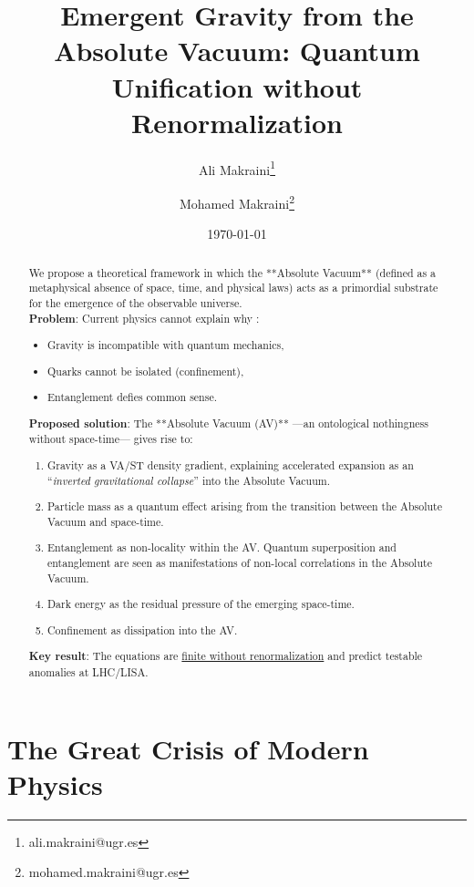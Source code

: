 \documentclass[a4paper]{article}
\title{Emergent Gravity from the Absolute Vacuum: Quantum Unification without Renormalization}
\author[1]{Ali Makraini\thanks{ali.makraini@ugr.es}}
\author[1]{Mohamed Makraini\thanks{mohamed.makraini@ugr.es}}
\affil[1]{\normalsize Department of Physics, University of Granada}
\date{\today}
\theoremstyle{definition}
\theoremstyle{remark}
\numberwithin{equation}{section}
\begin{document}
	
	\maketitle
\begin{abstract}
	\noindent
	We propose a theoretical framework in which the **Absolute Vacuum** (defined as a metaphysical absence of space, time, and physical laws) acts as a primordial substrate \cite{Carlip2012} for the emergence of the observable universe.\\
	
	\textbf{Problem}: Current physics cannot explain why \cite{Hossenfelder}:
	\begin{itemize}
		\item Gravity is incompatible with quantum mechanics,
		\item Quarks cannot be isolated (confinement),
		\item Entanglement defies common sense.
	\end{itemize}
	
	\textbf{Proposed solution}: The **Absolute Vacuum (AV)** —an ontological nothingness without space-time— gives rise to:
	\begin{enumerate}
		\item Gravity as a VA/ST density gradient, explaining accelerated expansion as an ``\textit{inverted gravitational collapse}'' into the Absolute Vacuum.
		\item Particle mass as a quantum effect arising from the transition between the Absolute Vacuum and space-time.
		\item Entanglement as non-locality within the AV. Quantum superposition and entanglement are seen as manifestations of non-local correlations in the Absolute Vacuum.
		\item Dark energy as the residual pressure of the emerging space-time.
		\item Confinement as dissipation into the AV.
	\end{enumerate}
	
	\textbf{Key result}: The equations are \underline{finite without renormalization} and predict testable anomalies at LHC/LISA.
\end{abstract}

	
\section{The Great Crisis of Modern Physics}

\label{sec:crisis}
\end{document}
